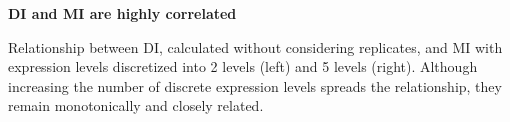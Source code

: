 \caption{\textbf{DI and MI are highly correlated}}
Relationship between DI, calculated without considering replicates, and MI with expression levels discretized into 2 levels (left) and 5 levels (right). Although increasing the number of discrete expression levels spreads the relationship, they remain monotonically and closely related.
